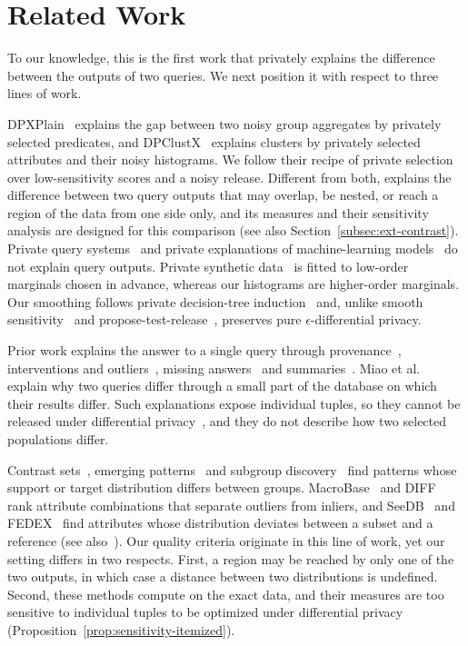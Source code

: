 \section{Related Work}
\label{sec:related}
To our knowledge, this is the first work that privately explains the difference between the outputs of two queries.
We next position it with respect to three lines of work.

DPXPlain~\cite{TaoGMR22} explains the gap between two noisy group aggregates by privately selected predicates, and DPClustX~\cite{DPClustX} explains clusters by privately selected attributes and their noisy histograms.
We follow their recipe of private selection over low-sensitivity scores and a noisy release.
Different from both, \sys{} explains the difference between two query outputs that may overlap, be nested, or reach a region of the data from one side only, and its measures and their sensitivity analysis are designed for this comparison (see also Section~\ref{subsec:ext-contrast}).
Private query systems~\cite{mcsherry2009,JNS18,JNHS20,GeHIM19} and private explanations of machine-learning models~\cite{PatelSZ22} do not explain query outputs.
Private synthetic data~\cite{McKennaMSM22} is fitted to low-order marginals chosen in advance, whereas our histograms are higher-order marginals.
Our smoothing follows private decision-tree induction~\cite{FriedmanSchuster10} and, unlike smooth sensitivity~\cite{NissimRS07} and propose-test-release~\cite{DworkLei09}, preserves pure $\epsilon$-differential privacy.



Prior work explains the answer to a single query through provenance~\cite{buneman2001,cheney2009,herschel2017}, interventions and outliers~\cite{RoyS14,wu2013,MZGR19}, missing answers~\cite{CJ09,tran2010conquer} and summaries~\cite{ExplanationTables}.
Miao et al.~\cite{MiaoRY19} explain why two queries differ through a small part of the database on which their results differ.
Such explanations expose individual tuples, so they cannot be released under differential privacy~\cite{TaoGMR22}, and they do not describe how two selected populations differ.

Contrast sets~\cite{BayPazzani01}, emerging patterns~\cite{DongLi99} and subgroup discovery~\cite{Wrobel97,HerreraCGJ11} find patterns whose support or target distribution differs between groups.
MacroBase~\cite{MacroBase} and DIFF~\cite{DIFF} rank attribute combinations that separate outliers from inliers, and SeeDB~\cite{SeeDB} and FEDEX~\cite{FEDEX} find attributes whose distribution deviates between a subset and a reference (see also~\cite{ICDE23,ShragaM23}).
Our quality criteria originate in this line of work, yet our setting differs in two respects.
First, a region may be reached by only one of the two outputs, in which case a distance between two distributions is undefined.
Second, these methods compute on the exact data, and their measures are too sensitive to individual tuples to be optimized under differential privacy (Proposition~\ref{prop:sensitivity-itemized}).


